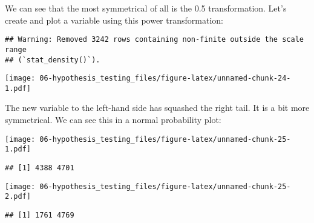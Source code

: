 \documentclass[
]{book}
\newenvironment{Shaded}{\begin{snugshade}}{\end{snugshade}}
\newcommand{\AttributeTok}[1]{\textcolor[rgb]{0.13,0.29,0.53}{#1}}
\newcommand{\FloatTok}[1]{\textcolor[rgb]{0.00,0.00,0.81}{#1}}
\newcommand{\FunctionTok}[1]{\textcolor[rgb]{0.13,0.29,0.53}{\textbf{#1}}}
\newcommand{\NormalTok}[1]{#1}
\newcommand{\OtherTok}[1]{\textcolor[rgb]{0.56,0.35,0.01}{#1}}
\newcommand{\SpecialCharTok}[1]{\textcolor[rgb]{0.81,0.36,0.00}{\textbf{#1}}}
\begin{document}
We can see that the most symmetrical of all is the 0.5 transformation. Let's create and plot a variable using this power transformation:

\begin{Shaded}
\end{Shaded}

\begin{verbatim}
## Warning: Removed 3242 rows containing non-finite outside the scale range
## (`stat_density()`).
\end{verbatim}

\texttt{[image: 06-hypothesis\_testing\_files/figure-latex/unnamed-chunk-24-1.pdf]}

The new variable to the left-hand side has squashed the right tail. It is a bit more symmetrical. We can see this in a normal probability plot:

\begin{Shaded}
\end{Shaded}

\texttt{[image: 06-hypothesis\_testing\_files/figure-latex/unnamed-chunk-25-1.pdf]}

\begin{verbatim}
## [1] 4388 4701
\end{verbatim}

\begin{Shaded}
\end{Shaded}

\texttt{[image: 06-hypothesis\_testing\_files/figure-latex/unnamed-chunk-25-2.pdf]}

\begin{verbatim}
## [1] 1761 4769
\end{verbatim}
\end{document}
